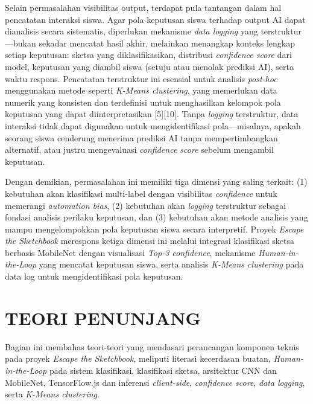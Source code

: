 \documentclass[12pt,oneside]{report}
\begin{document}
Selain permasalahan visibilitas output, terdapat pula tantangan dalam hal pencatatan interaksi siswa. Agar pola keputusan siswa terhadap output AI dapat dianalisis secara sistematis, diperlukan mekanisme \textit{data logging} yang terstruktur—bukan sekadar mencatat hasil akhir, melainkan menangkap konteks lengkap setiap keputusan: sketsa yang diklasifikasikan, distribusi \textit{confidence score} dari model, keputusan yang diambil siswa (setuju atau menolak prediksi AI), serta waktu respons. Pencatatan terstruktur ini esensial untuk analisis \textit{post-hoc} menggunakan metode seperti \textit{K-Means clustering}, yang memerlukan data numerik yang konsisten dan terdefinisi untuk menghasilkan kelompok pola keputusan yang dapat diinterpretasikan [5][10]. Tanpa \textit{logging} terstruktur, data interaksi tidak dapat digunakan untuk mengidentifikasi pola—misalnya, apakah seorang siswa cenderung menerima prediksi AI tanpa mempertimbangkan alternatif, atau justru mengevaluasi \textit{confidence score} sebelum mengambil keputusan.

Dengan demikian, permasalahan ini memiliki tiga dimensi yang saling terkait: (1) kebutuhan akan klasifikasi multi-label dengan visibilitas \textit{confidence} untuk memerangi \textit{automation bias}, (2) kebutuhan akan \textit{logging} terstruktur sebagai fondasi analisis perilaku keputusan, dan (3) kebutuhan akan metode analisis yang mampu mengelompokkan pola keputusan siswa secara interpretif. Proyek \textit{Escape the Sketchbook} merespons ketiga dimensi ini melalui integrasi klasifikasi sketsa berbasis MobileNet dengan visualisasi \textit{Top-3 confidence}, mekanisme \textit{Human-in-the-Loop} yang mencatat keputusan siswa, serta analisis \textit{K-Means clustering} pada data log untuk mengidentifikasi pola keputusan.

\section{TEORI PENUNJANG}
\label{sec:teori-penunjang}

Bagian ini membahas teori-teori yang mendasari perancangan komponen teknis pada proyek \textit{Escape the Sketchbook}, meliputi literasi kecerdasan buatan, \textit{Human-in-the-Loop} pada sistem klasifikasi, klasifikasi sketsa, arsitektur CNN dan MobileNet, TensorFlow.js dan inferensi \textit{client-side}, \textit{confidence score}, \textit{data logging}, serta \textit{K-Means clustering}.
\end{document}
